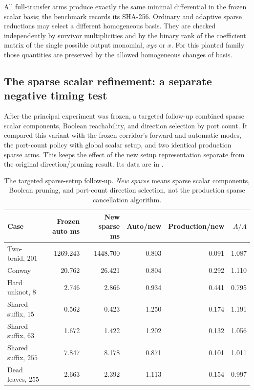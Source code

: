 All full-transfer arms produce exactly the same minimal
differential in the frozen scalar basis; the benchmark records its
SHA-256. Ordinary and adaptive sparse reductions may select a
different homogeneous basis. They are checked independently by
survivor multiplicities and by the binary rank of the coefficient
matrix of the single possible output monomial, \(xyz\) or \(x\).
For this planted family those quantities are preserved by the
allowed homogeneous changes of basis.

\subsection{The sparse scalar refinement: a separate negative timing test}

After the principal experiment was frozen, a targeted follow-up combined
sparse scalar components, Boolean reachability, and direction selection
by port count. It compared this variant with the frozen corridor's
forward and automatic modes, the port-count policy with
global scalar setup, and two identical production sparse arms.
This keeps the effect of the new setup representation separate from
the original direction/pruning result. Its data are in
.

\begin{table}[htbp]
\centering
\small
\setlength{\tabcolsep}{5pt}
\begin{tabular}{@{}lrrrrr@{}}
\toprule
Case & Frozen auto ms & New sparse ms &
Auto/new & Production/new & \(A/A\)\\
\midrule
Two-braid, \(201\) & 1269.243 & 1448.700 & 0.803 & 0.091 & 1.087\\
Conway & 20.762 & 26.421 & 0.804 & 0.292 & 1.110\\
Hard unknot, \(8\) & 2.746 & 2.866 & 0.934 & 0.441 & 0.795\\
Shared suffix, \(15\) & 0.562 & 0.423 & 1.250 & 0.174 & 1.191\\
Shared suffix, \(63\) & 1.672 & 1.422 & 1.202 & 0.132 & 1.056\\
Shared suffix, \(255\) & 7.847 & 8.178 & 0.871 & 0.101 & 1.011\\
Dead leaves, \(255\) & 2.663 & 2.392 & 1.113 & 0.154 & 0.997\\
\bottomrule
\end{tabular}
\caption{The targeted sparse-setup follow-up. \emph{New sparse} means
sparse scalar components, Boolean pruning, and port-count direction
selection, not the production sparse cancellation algorithm.}
\label{tab:compressed-setup}
\end{table}

